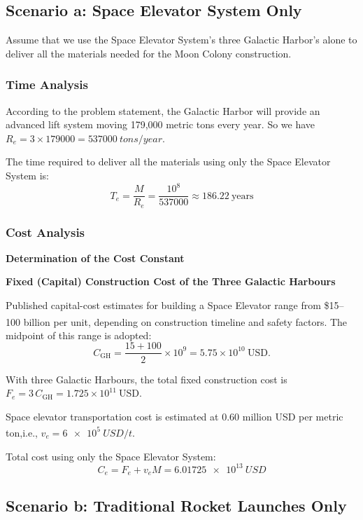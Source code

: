 \documentclass[12pt]{mcmthesis}
\begin{document}
\subsection{Scenario a: Space Elevator System Only}

Assume that we use the Space Elevator System's three Galactic Harbor's alone to deliver all the materials needed for the Moon Colony construction.

\subsubsection{Time Analysis}

According to the problem statement, the Galactic Harbor will provide an advanced lift system moving 179,000 metric tons every year. So we have $R_e=3\times179000=\SI{537000}{tons/year}$.

The time required to deliver all the materials using only the Space Elevator System is:
\[T_e=\frac{M}{R_e} = \frac{10^8}{537000} \approx 186.22\ \text{years}\]
\subsubsection{Cost Analysis}

\textbf{Determination of the Cost Constant}

\textbf{Fixed (Capital) Construction Cost of the Three Galactic Harbours}

Published capital-cost estimates for building a Space Elevator range from \$15--100 billion per unit, depending on construction timeline and safety factors\textsuperscript{\cite{8}}. The midpoint of this range is adopted:
\[
    C_{\mathrm{GH}} = \frac{15+100}{2}\times 10^{9} = 5.75\times 10^{10}\ \mathrm{USD}.
\]

With three Galactic Harbours, the total fixed construction cost is $
    F_e = 3\,C_{\mathrm{GH}} = 1.725\times 10^{11}\ \mathrm{USD}$.

Space elevator transportation cost is estimated at 0.60 million USD per metric ton\textsuperscript{\cite{3}\cite{7}},i.e.,
$v_e=\SI{6e5}{USD/t}$.

Total cost using only the Space Elevator System:
\[C_e=F_e+v_eM=\SI{6.01725e13}{USD}\]

\subsection{Scenario b: Traditional Rocket Launches Only}
\end{document}
